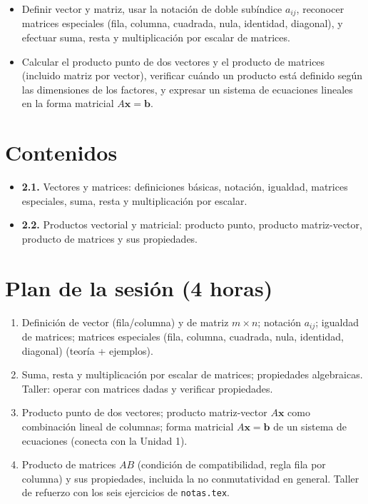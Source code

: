\documentclass[11pt,letterpaper]{article}
\newcommand{\vv}[1]{\mathbf{#1}}
\begin{document}
\begin{itemize}[leftmargin=1.2cm]
  \item[\textbf{RA2.1.}] Definir vector y matriz, usar la notación de doble subíndice $a_{ij}$,
        reconocer matrices especiales (fila, columna, cuadrada, nula, identidad, diagonal), y
        efectuar suma, resta y multiplicación por escalar de matrices.
  \item[\textbf{RA2.2.}] Calcular el producto punto de dos vectores y el producto de matrices
        (incluido matriz por vector), verificar cuándo un producto está definido según las
        dimensiones de los factores, y expresar un sistema de ecuaciones lineales en la forma
        matricial $A\vv{x}=\vv{b}$.
\end{itemize}

\section{Contenidos}

\begin{itemize}[leftmargin=1.2cm]
  \item \textbf{2.1.} Vectores y matrices: definiciones básicas, notación, igualdad, matrices
        especiales, suma, resta y multiplicación por escalar.
  \item \textbf{2.2.} Productos vectorial y matricial: producto punto, producto matriz-vector,
        producto de matrices y sus propiedades.
\end{itemize}

\section{Plan de la sesión (4 horas)}

\begin{enumerate}[leftmargin=1.2cm]
  \item[\textbf{Hora 1.}] Definición de vector (fila/columna) y de matriz $m\times n$; notación
        $a_{ij}$; igualdad de matrices; matrices especiales (fila, columna, cuadrada, nula,
        identidad, diagonal) (teoría + ejemplos).
  \item[\textbf{Hora 2.}] Suma, resta y multiplicación por escalar de matrices; propiedades
        algebraicas. Taller: operar con matrices dadas y verificar propiedades.
  \item[\textbf{Hora 3.}] Producto punto de dos vectores; producto matriz-vector $A\vv{x}$ como
        combinación lineal de columnas; forma matricial $A\vv{x}=\vv{b}$ de un sistema de
        ecuaciones (conecta con la Unidad 1).
  \item[\textbf{Hora 4.}] Producto de matrices $AB$ (condición de compatibilidad, regla fila por
        columna) y sus propiedades, incluida la no conmutatividad en general. Taller de
        refuerzo con los seis ejercicios de \texttt{notas.tex}.
\end{enumerate}
\end{document}
